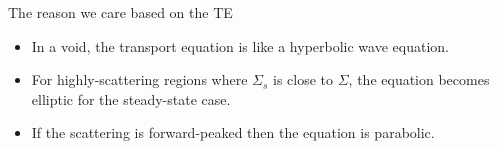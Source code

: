 \documentclass[12pt]{article}
\newcommand{\Macro}{\ensuremath{\Sigma}}
\begin{document}
\noindent The reason we care based on the TE
\begin{itemize}
\item In a void, the transport equation is like a hyperbolic wave equation. 
\item For highly-scattering regions where $\Macro_{s}$ is close to $\Macro$, the equation becomes elliptic for the steady-state case. 
\item If the scattering is forward-peaked then the equation is parabolic.
\end{itemize}


%


%
%
\end{document}
